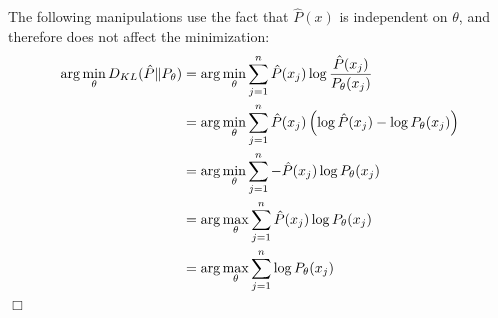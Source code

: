 \begin{answer}
The following manipulations use the fact that $\hat{P}(x)$ is independent on $\theta$, and therefore does not affect the minimization:
\begin{align*}
    \arg\min_\theta D_{KL}(\hat{P}\|P_\theta) 
    &= \arg\min_\theta \sum_{j=1}^n\hat{P}(x_j) \log\frac{\hat{P}(x_j)}{P_\theta(x_j)}\\
    &= \arg\min_\theta \sum_{j=1}^n\hat{P}(x_j) \left(\log\hat{P}(x_j)- \log{P_\theta(x_j)} \right)\\
    &= \arg\min_\theta \sum_{j=1}^n- \hat{P}(x_j)\log{P_\theta(x_j)} \\
    &=  \arg\max_\theta \sum_{j=1}^n\hat{P}(x_j)\log{P_\theta(x_j)} \\
    &=  \arg\max_\theta \sum_{j=1}^n\log{P_\theta(x_j)} \\
\end{align*}    
\hfill \ensuremath{\Box}
\end{answer}

